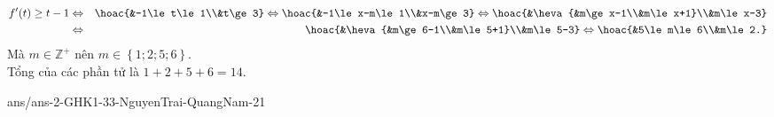 \begin{ex}
{{
		}
		\noindent
		\begin{eqnarray*}
			f'(t)\ge t-1&\Leftrightarrow &\hoac{&-1\le t\le 1\\&t\ge 3}\Leftrightarrow \hoac{&-1\le x-m\le 1\\&x-m\ge 3}\Leftrightarrow \hoac{&\heva{&m\ge x-1\\&m\le x+1}\\&m\le x-3}\\&\Leftrightarrow &\hoac{&\heva{&m\ge 6-1\\&m\le 5+1}\\&m\le 5-3}\Leftrightarrow\hoac{&5\le m\le 6\\&m\le 2.}
		\end{eqnarray*}
		Mà $m\in\mathbb{Z}^+$ nên $m\in\left \{1;2;5;6\right\} $.\\
		Tổng của các phần tử là $1+2+5+6=14$.
	}
\end{ex}


\begin{indapan}{10}
	{ans/ans-2-GHK1-33-NguyenTrai-QuangNam-21}
\end{indapan}
